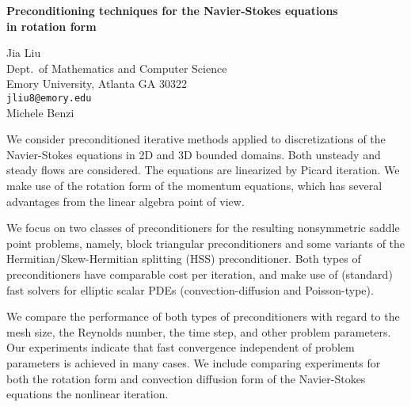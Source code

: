 \documentclass{report}
\begin{document}

\begin{center}
{\large
{\bf Preconditioning techniques for the Navier-Stokes equations \\
	in rotation form}}

	Jia Liu \\
	Dept.~of Mathematics and Computer Science \\
	Emory University, Atlanta GA 30322 \\
	{\tt jliu8@emory.edu} \\
	Michele Benzi
\end{center}
We consider preconditioned iterative methods applied to
discretizations of the Navier-Stokes equations in 2D and 3D
bounded domains. Both unsteady and steady flows are
considered. The equations are linearized by Picard
iteration. We make use of the rotation form of the momentum
equations, which has several advantages from the linear
algebra point of view.

We focus on two classes of
preconditioners for the resulting nonsymmetric saddle point
problems, namely, block triangular preconditioners and some
variants of the Hermitian/Skew-Hermitian splitting (HSS)
preconditioner. Both types of preconditioners have
comparable cost per iteration, and make use of (standard)
fast solvers for elliptic scalar PDEs (convection-diffusion
and Poisson-type).

We compare the performance of both
types of preconditioners with regard to the mesh size, the
Reynolds number, the time step, and other problem
parameters. Our experiments indicate that fast convergence
independent of problem parameters is achieved in many cases.
We include comparing experiments for both the rotation form
and convection diffusion form of the Navier-Stokes equations
the nonlinear iteration.



\end{document}
